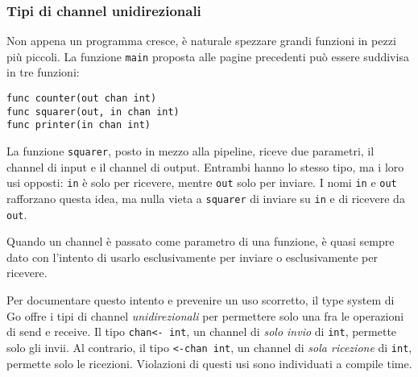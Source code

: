 \documentclass[../../../thesis.tex]{subfiles}
\begin{document}
    \subsubsection{Tipi di channel unidirezionali}
    Non appena un programma cresce, è naturale spezzare grandi funzioni in pezzi più piccoli.
    La funzione \verb"main" proposta alle pagine precedenti può essere suddivisa in tre funzioni:
    \begin{lstlisting}[frame = single, label = {lst:lstlisting7-4-3.1}]
func counter(out chan int)
func squarer(out, in chan int)
func printer(in chan int)
    \end{lstlisting}
    La funzione \verb"squarer", posto in mezzo alla pipeline, riceve due parametri, il channel di input e il channel di output.
    Entrambi hanno lo stesso tipo, ma i loro usi opposti: \verb"in" è solo per ricevere, mentre \verb"out" solo per inviare.
    I nomi \verb"in" e \verb"out" rafforzano questa idea, ma nulla vieta a \verb"squarer" di inviare su \verb"in" e di ricevere da \verb"out".
    \hfill \vspace{12pt}

    Quando un channel è passato come parametro di una funzione, è quasi sempre dato con l'intento di usarlo esclusivamente per inviare o esclusivamente per ricevere.
    \hfill \vspace{12pt}

    Per documentare questo intento e prevenire un uso scorretto, il type system di Go offre i tipi di channel \textit{unidirezionali} per permettere solo una fra le operazioni di send e receive.
    Il tipo \verb"chan<- int", un channel di \textit{solo invio} di \verb"int", permette solo gli invii.
    Al contrario, il tipo \verb"<-chan int", un channel di \textit{sola ricezione} di \verb"int", permette solo le ricezioni.
    Violazioni di questi usi sono individuati a compile time.
    \hfill \vspace{12pt}
\end{document}
